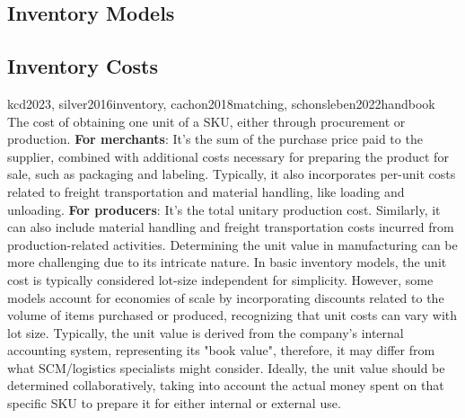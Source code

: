 \documentclass{jorbnc_cheatsheet}
\begin{document}
\begin{multicols*}{4}

\subsection{Inventory Models}



\subsection{Inventory Costs}

{kcd2023, silver2016inventory, cachon2018matching, schonsleben2022handbook}{
The cost of obtaining one unit of a SKU, either through procurement or production.
\breakspace
\textbf{For merchants}:
It's the sum of the purchase price paid to the supplier, combined with additional costs necessary 
for preparing the product for sale, such as packaging and labeling. Typically, it also incorporates 
per-unit costs related to freight transportation and material handling, like loading and unloading.
\breakspace
\textbf{For producers}:
It's the total unitary production cost. Similarly, it can also include material handling and freight
transportation costs incurred from production-related activities.
Determining the unit value in manufacturing can be more challenging  due to its intricate nature.
\breakspace
In basic inventory models, the unit cost is typically considered lot-size independent for simplicity.
However, some models account for economies of scale by incorporating discounts related to the volume of 
items purchased or produced, recognizing that unit costs can vary with lot size.
\breakspace
Typically, the unit value is derived from the company's internal accounting system, 
representing its "book value",
therefore, it may differ from what SCM/logistics specialists might consider. 
Ideally, the unit value should be determined collaboratively, taking into account the actual money 
spent on that specific SKU to prepare it for either internal or external use.
}




\end{multicols*}
\end{document}
